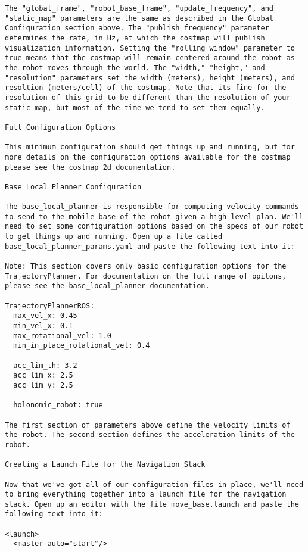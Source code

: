 \begin{verbatim}
The "global_frame", "robot_base_frame", "update_frequency", and "static_map" parameters are the same as described in the Global Configuration section above. The "publish_frequency" parameter determines the rate, in Hz, at which the costmap will publish visualization information. Setting the "rolling_window" parameter to true means that the costmap will remain centered around the robot as the robot moves through the world. The "width," "height," and "resolution" parameters set the width (meters), height (meters), and resoltion (meters/cell) of the costmap. Note that its fine for the resolution of this grid to be different than the resolution of your static map, but most of the time we tend to set them equally.

Full Configuration Options

This minimum configuration should get things up and running, but for more details on the configuration options available for the costmap please see the costmap_2d documentation.

Base Local Planner Configuration

The base_local_planner is responsible for computing velocity commands to send to the mobile base of the robot given a high-level plan. We'll need to set some configuration options based on the specs of our robot to get things up and running. Open up a file called base_local_planner_params.yaml and paste the following text into it:

Note: This section covers only basic configuration options for the TrajectoryPlanner. For documentation on the full range of opitons, please see the base_local_planner documentation.

TrajectoryPlannerROS:
  max_vel_x: 0.45
  min_vel_x: 0.1
  max_rotational_vel: 1.0
  min_in_place_rotational_vel: 0.4

  acc_lim_th: 3.2
  acc_lim_x: 2.5
  acc_lim_y: 2.5

  holonomic_robot: true

The first section of parameters above define the velocity limits of the robot. The second section defines the acceleration limits of the robot.

Creating a Launch File for the Navigation Stack

Now that we've got all of our configuration files in place, we'll need to bring everything together into a launch file for the navigation stack. Open up an editor with the file move_base.launch and paste the following text into it:

<launch>
  <master auto="start"/>


\end{verbatim}
